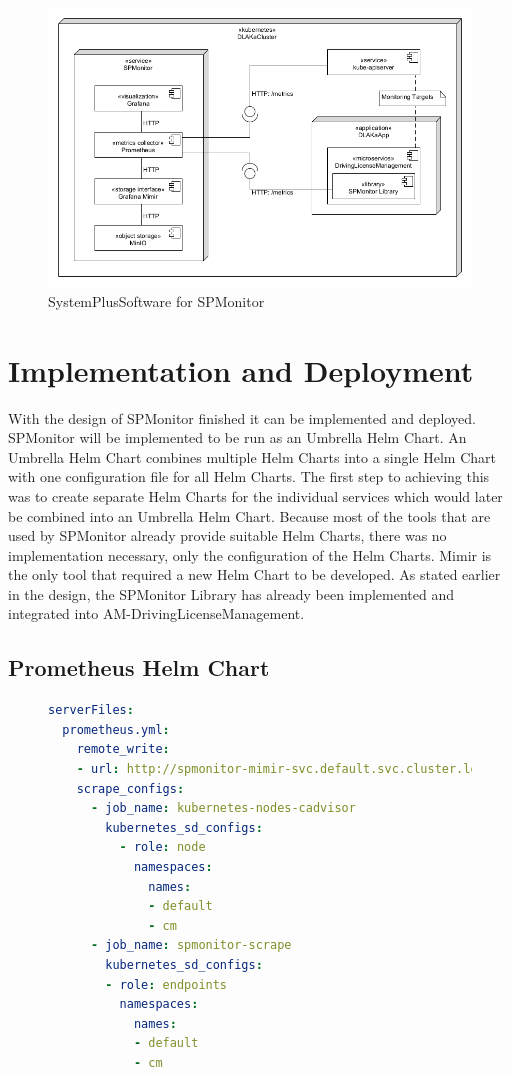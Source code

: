 \begin{figure}[tb]
  \centering
  \includegraphics[width=\textwidth]{figures/6.4_sps_spmonitor.png}
  \caption{SystemPlusSoftware for SPMonitor}
  \label{fig:sps_spmonitor}
\end{figure}

\section{Implementation and Deployment}
\label{sec:impl_and_deployment}

With the design of SPMonitor finished it can be implemented and deployed.
SPMonitor will be implemented to be run as an Umbrella Helm Chart.
An Umbrella Helm Chart combines multiple Helm Charts into a single Helm Chart with one configuration file
for all Helm Charts.
The first step to achieving this was to create separate Helm Charts for the individual services
which would later be combined into an Umbrella Helm Chart.
Because most of the tools that are used by SPMonitor already provide suitable Helm Charts,
there was no implementation necessary, only the configuration of the Helm Charts. Mimir is the only tool
that required a new Helm Chart to be developed.
As stated earlier in the design, the SPMonitor Library has already been implemented and integrated into AM-DrivingLicenseManagement.

\subsection*{Prometheus Helm Chart}

\begin{figure}[tb]
\begin{lstlisting}[caption = {Prometheus Helm Chart Configuration}, label = {lis:prometheus_config}, style = kit-cm, language=yaml]
serverFiles:
  prometheus.yml:
    remote_write:
    - url: http://spmonitor-mimir-svc.default.svc.cluster.local:9009/api/v1/push
    scrape_configs:
      - job_name: kubernetes-nodes-cadvisor
        kubernetes_sd_configs:
          - role: node
            namespaces:
              names:
              - default
              - cm
      - job_name: spmonitor-scrape
        kubernetes_sd_configs:
        - role: endpoints
          namespaces:
            names:
            - default
            - cm
\end{lstlisting}
\end{figure}


